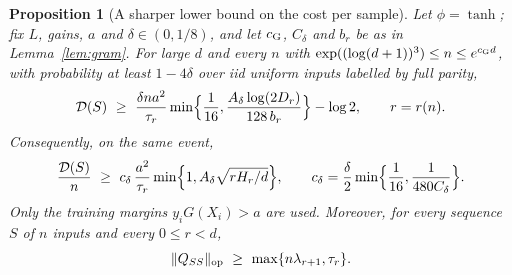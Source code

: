 \documentclass[11pt]{article}
\newtheorem{proposition}[theorem]{Proposition}
\theoremstyle{definition}\newtheorem{assumption}[theorem]{Assumption}
\theoremstyle{remark}\newtheorem{remark}[theorem]{Remark}
\begin{document}
\begin{proposition}[A sharper lower bound on the cost per sample]
\label{prop:linear}
Let $\phi=\tanh$; fix $L$, gains, $a$ and $\delta\in(0,1/8)$, and let
$c_{\rm G}$, $C_\delta$ and $b_r$ be as in Lemma~\ref{lem:gram}. For large
$d$ and every $n$ with $\exp((\log(d+1))^3)\le n\le e^{c_{\rm G}d}$, with
probability at least $1-4\delta$ over iid uniform inputs labelled by full
parity,
\begin{equation}\label{eq:linear-cost}
 \mathcal D(S)\ \ge\ \frac{\delta na^2}{\tau_r}
 \min\Bigl\{\frac1{16},\frac{A_\delta\log(2D_r)}{128\,b_r}\Bigr\}-\log2,
 \qquad r=r(n).
\end{equation}
Consequently, on the same event,
\begin{equation}\label{eq:linear-persample}
 \frac{\mathcal D(S)}n\ \ge\ c_\delta\,\frac{a^2}{\tau_r}
 \min\Bigl\{1,A_\delta\sqrt{rH_r/d}\Bigr\},\qquad
 c_\delta=\frac\delta2\min\Bigl\{\frac1{16},\frac1{480C_\delta}\Bigr\}.
\end{equation}
Only the training margins $y_iG(X_i)>a$ are used. Moreover, for every
sequence $S$ of $n$ inputs and every $0\le r<d$,
\begin{equation}\label{eq:gram-lower}
 \|Q_{SS}\|_{\rm op}\ \ge\ \max\{n\lambda_{r+1},\tau_r\}.
\end{equation}
\end{proposition}
\end{document}
